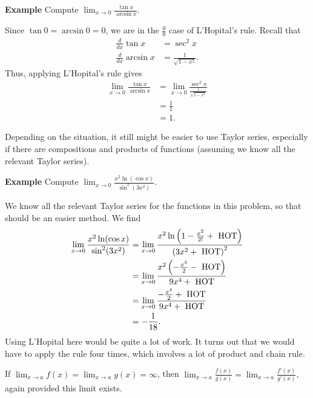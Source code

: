 \documentclass[twoside,openright,titlepage,a4paper]{book}
\begin{document}
\begin{sloppypar}
\textbf{Example} Compute $\displaystyle \lim_{x \rightarrow 0} \frac{\tan x}{\arcsin x}$.
\begin{examplebox}
Since $\tan 0 = \arcsin 0 = 0$, we are in the $\frac{0}{0}$ case of L'Hopital's rule. Recall that
\begin{align*}
\frac{d}{dx} \tan x &= \sec^2 x \\
\frac{d}{dx} \arcsin x &= \frac{1}{\sqrt{1-x^2}}.
\end{align*}
Thus, applying L'Hopital's rule gives
\begin{align*}
\lim_{x \rightarrow 0} \frac{\tan x}{\arcsin x} &= \lim_{x \rightarrow 0} \frac{ \sec^2 x }{ \frac{1}{\sqrt{1-x^2}} } \\
&= \frac{1}{1} \\
&= 1.
\end{align*}
\end{examplebox}
Depending on the situation, it still might be easier to use Taylor series, especially if there are compositions and products of functions (assuming we know all the relevant Taylor series).

\textbf{Example} Compute $\displaystyle \lim_{x \rightarrow 0} \frac{x^2 \ln( \cos x)}{\sin^2(3x^2)} $. 
\begin{examplebox}
We know all the relevant Taylor series for the functions in this problem, so that should be an easier method. We find
\begin{align*}
\lim_{x\rightarrow 0} \frac{x^2 \ln(\cos x)}{\sin^2(3x^2)} &= \lim_{x \rightarrow 0} \frac{x^2 \ln \left(1-\frac{x^2}{2!} + \hbox{ HOT}\right)}{\left(3x^2 + \hbox{ HOT}\right)^2} \\
&= \lim_{x \rightarrow 0} \frac{x^2 \left(-\frac{x^2}{2} - \hbox{ HOT}\right)}{9x^4 + \hbox{ HOT}} \\
&= \lim_{x \rightarrow 0} \frac{-\frac{x^4}{2} + \hbox{ HOT}}{9 x^4 + \hbox{ HOT}} \\
&= -\frac{1}{18}. 
\end{align*}
Using L'Hopital here would be quite a lot of work. It turns out that we would have to apply the rule four times, which involves a lot of product and chain rule.
\end{examplebox}

\begin{definitionbox}[title=\textbf{L'Hopital's Rule, $\frac{\infty}{\infty}$ case}]
If $\displaystyle \lim_{x\rightarrow a} f(x) = \lim_{x \rightarrow a} g(x) = \infty$, then $\displaystyle\lim_{x \rightarrow a} \frac{f(x)}{g(x)} = \lim_{x\rightarrow a} \frac{f'(x)}{g'(x)}$, again provided this limit exists.	
\end{definitionbox}


\end{sloppypar}
\end{document}

